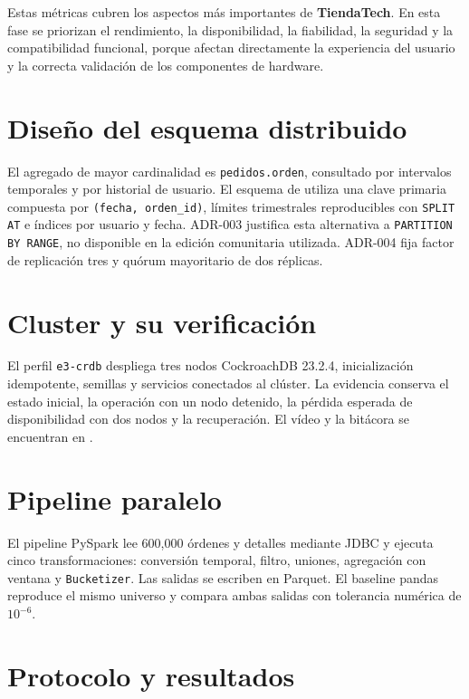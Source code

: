 \documentclass[12pt]{article}
\begin{document}
    Estas métricas cubren los aspectos más importantes de \textbf{TiendaTech}. En esta fase se priorizan el rendimiento, la disponibilidad, la fiabilidad, la seguridad y la compatibilidad funcional, porque afectan directamente la experiencia del usuario y la correcta validación de los componentes de hardware.


    \newpage

    \section{Diseño del esquema distribuido}

    El agregado de mayor cardinalidad es \texttt{pedidos.orden}, consultado por
    intervalos temporales y por historial de usuario. El esquema de
     utiliza una clave primaria compuesta por
    \texttt{(fecha, orden\_id)}, límites trimestrales reproducibles con
    \texttt{SPLIT AT} e índices por usuario y fecha. ADR-003 justifica esta
    alternativa a \texttt{PARTITION BY RANGE}, no disponible en la edición
    comunitaria utilizada. ADR-004 fija factor de replicación tres y quórum
    mayoritario de dos réplicas.

    \section{Cluster y su verificación}

    El perfil \texttt{e3-crdb} despliega tres nodos CockroachDB 23.2.4,
    inicialización idempotente, semillas y servicios conectados al clúster. La
    evidencia conserva el estado inicial, la operación con un nodo detenido, la
    pérdida esperada de disponibilidad con dos nodos y la recuperación. El vídeo
    y la bitácora se encuentran en .

    \section{Pipeline paralelo}

    El pipeline PySpark lee 600,000 órdenes y detalles mediante JDBC y ejecuta
    cinco transformaciones: conversión temporal, filtro, uniones, agregación con
    ventana y \texttt{Bucketizer}. Las salidas se escriben en Parquet. El
    baseline pandas reproduce el mismo universo y
     compara ambas salidas con tolerancia
    numérica de $10^{-6}$.

    \section{Protocolo y resultados}
\end{document}
